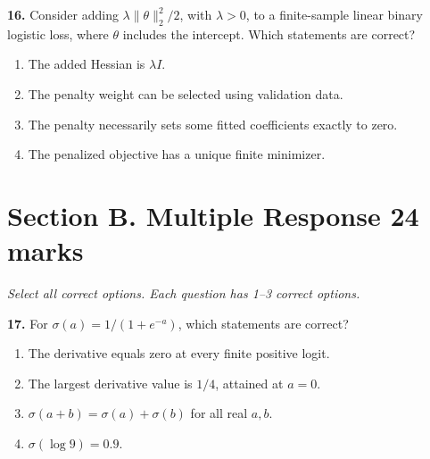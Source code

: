 \documentclass[11pt,a4paper]{article}
\begin{document}
\par\noindent\begin{minipage}{\linewidth}
\textbf{16.} Consider adding \(\lambda\|\theta\|_2^2/2\), with \(\lambda>0\), to a finite-sample linear binary logistic loss, where \(\theta\) includes the intercept. Which statements are correct?
\begin{enumerate}[label=(\Alph*),leftmargin=8mm,itemsep=2pt,topsep=2pt]
\item The added Hessian is \(\lambda I\).
\item The penalty weight can be selected using validation data.
\item The penalty necessarily sets some fitted coefficients exactly to zero.
\item The penalized objective has a unique finite minimizer.
\end{enumerate}

\end{minipage}\par\vspace{3mm}
\newpage\section*{Section B. Multiple Response \hfill 24 marks}
\textit{Select all correct options. Each question has 1--3 correct options.}\par
\par\noindent\begin{minipage}{\linewidth}
\textbf{17.} For \(\sigma(a)=1/(1+e^{-a})\), which statements are correct?
\begin{enumerate}[label=(\Alph*),leftmargin=8mm,itemsep=2pt,topsep=2pt]
\item The derivative equals zero at every finite positive logit.
\item The largest derivative value is \(1/4\), attained at \(a=0\).
\item \(\sigma(a+b)=\sigma(a)+\sigma(b)\) for all real \(a,b\).
\item \(\sigma(\log9)=0.9\).
\end{enumerate}

\end{minipage}\par\vspace{3mm}
\end{document}
